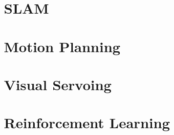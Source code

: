 \documentclass{report}
\begin{document}


\part{SLAM}





\part{Motion Planning}




% 

\part{Visual Servoing}



\part{Reinforcement Learning}


\end{document}

